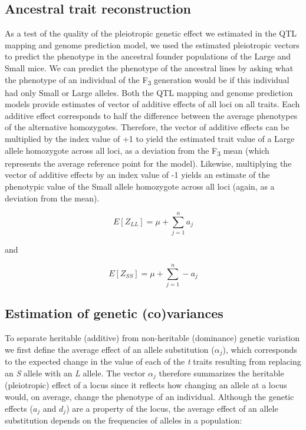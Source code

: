 \begin{refsection}
\subsection{Ancestral trait reconstruction}

As a test of the quality of the pleiotropic genetic effect we estimated
in the QTL mapping and genome prediction model, we used the estimated
pleiotropic vectors to predict the phenotype in the ancestral founder
populations of the Large and Small mice. We can predict the phenotype of
the ancestral lines by asking what the phenotype of an individual of the
F\textsubscript{3} generation would be if this individual had only Small
or Large alleles. Both the QTL mapping and genome prediction models
provide estimates of vector of additive effects of all loci on all
traits. Each additive effect corresponds to half the difference between
the average phenotypes of the alternative homozygotes. Therefore, the
vector of additive effects can be multiplied by the index value of {+1} to
yield the estimated trait value of a Large allele homozygote across all
loci, as a deviation from the F\textsubscript{3} mean (which represents
the average reference point for the model). Likewise, multiplying the
vector of additive effects by an index value of {-1} yields an estimate of
the phenotypic value of the Small allele homozygote across all loci
(again, as a deviation from the mean).

\begin{equation}
E\left\lbrack Z_{LL} \right\rbrack = \mu + \sum_{j=1}^n a_{j}
\end{equation}

and

\begin{equation}
E\left\lbrack Z_{SS} \right\rbrack = \mu + \sum_{j=1}^n -a_{j}
\end{equation}

\subsection{Estimation of genetic (co)variances}

To separate heritable (additive) from non-heritable (dominance) genetic
variation we first define the average effect of an allele substitution
(\(\alpha_{j}\)), which corresponds to the expected change in the value
of each of the \emph{t} traits resulting from replacing an \emph{S}
allele with an \emph{L} allele. The vector \(\alpha_{j}\) therefore
summarizes the heritable (pleiotropic) effect of a locus since it
reflects how changing an allele at a locus would, on average, change the
phenotype of an individual. Although the genetic effects (\(a_{j}\) and
\(d_{j}\)) are a property of the locus, the average effect of an allele
substitution depends on the frequencies of alleles in a population:


\end{refsection}
